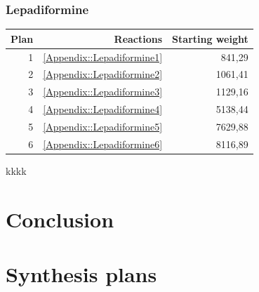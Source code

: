 \documentclass[a4paper,10pt,titlepage]{paper}
\begin{document}
\subsubsection{Lepadiformine}
\begin{table}[H]
\centering
\begin{tabular}{|r|r|r|}
\hline
Plan & Reactions & Starting weight \\ \hline
1 & \ref{Appendix::Lepadiformine1} & 841,29 \\\hline
2 & \ref{Appendix::Lepadiformine2} & 1061,41 \\\hline
3 & \ref{Appendix::Lepadiformine3} & 1129,16 \\\hline
4 & \ref{Appendix::Lepadiformine4} & 5138,44 \\\hline
5 & \ref{Appendix::Lepadiformine5} & 7629,88 \\\hline
6 & \ref{Appendix::Lepadiformine6} & 8116,89 \\\hline
\end{tabular}
\end{table}

kkkk \cite{SynthesisPlans}\\

\section{Conclusion}

\newpage

\printbibliography[type=book, title={Books}]
\printbibliography[type=article, title={Articles}]
\printbibliography[nottype=book, nottype=article, title={Other}]

\newpage
\appendix
{}

\section{Synthesis plans}
\end{document}

